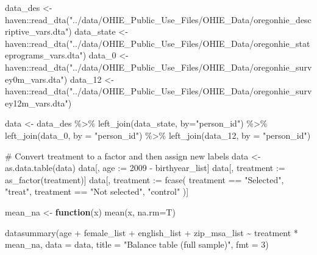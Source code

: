 \documentclass[
  letterpaper,
  DIV=11,
  numbers=noendperiod]{scrartcl}
\newenvironment{Shaded}{\begin{snugshade}}{\end{snugshade}}
\newcommand{\AttributeTok}[1]{\textcolor[rgb]{0.40,0.45,0.13}{#1}}
\newcommand{\CommentTok}[1]{\textcolor[rgb]{0.37,0.37,0.37}{#1}}
\newcommand{\ControlFlowTok}[1]{\textcolor[rgb]{0.00,0.23,0.31}{\textbf{#1}}}
\newcommand{\DecValTok}[1]{\textcolor[rgb]{0.68,0.00,0.00}{#1}}
\newcommand{\ErrorTok}[1]{\textcolor[rgb]{0.68,0.00,0.00}{#1}}
\newcommand{\FunctionTok}[1]{\textcolor[rgb]{0.28,0.35,0.67}{#1}}
\newcommand{\NormalTok}[1]{\textcolor[rgb]{0.00,0.23,0.31}{#1}}
\newcommand{\OtherTok}[1]{\textcolor[rgb]{0.00,0.23,0.31}{#1}}
\newcommand{\SpecialCharTok}[1]{\textcolor[rgb]{0.37,0.37,0.37}{#1}}
\newcommand{\StringTok}[1]{\textcolor[rgb]{0.13,0.47,0.30}{#1}}
\begin{document}
\begin{Shaded}
\begin{Highlighting}[]
\NormalTok{data\_des }\OtherTok{\textless{}{-}}\NormalTok{ haven}\SpecialCharTok{::}\FunctionTok{read\_dta}\NormalTok{(}\StringTok{"../data/OHIE\_Public\_Use\_Files/OHIE\_Data/oregonhie\_descriptive\_vars.dta"}\NormalTok{)}
\NormalTok{data\_state }\OtherTok{\textless{}{-}}\NormalTok{ haven}\SpecialCharTok{::}\FunctionTok{read\_dta}\NormalTok{(}\StringTok{"../data/OHIE\_Public\_Use\_Files/OHIE\_Data/oregonhie\_stateprograms\_vars.dta"}\NormalTok{)}
\NormalTok{data\_0 }\OtherTok{\textless{}{-}}\NormalTok{ haven}\SpecialCharTok{::}\FunctionTok{read\_dta}\NormalTok{(}\StringTok{"../data/OHIE\_Public\_Use\_Files/OHIE\_Data/oregonhie\_survey0m\_vars.dta"}\NormalTok{)}
\NormalTok{data\_12 }\OtherTok{\textless{}{-}}\NormalTok{ haven}\SpecialCharTok{::}\FunctionTok{read\_dta}\NormalTok{(}\StringTok{"../data/OHIE\_Public\_Use\_Files/OHIE\_Data/oregonhie\_survey12m\_vars.dta"}\NormalTok{)}

\NormalTok{data }\OtherTok{\textless{}{-}}\NormalTok{ data\_des }\SpecialCharTok{\%\textgreater{}\%} 
  \FunctionTok{left\_join}\NormalTok{(data\_state, }\AttributeTok{by=}\StringTok{"person\_id"}\NormalTok{) }\SpecialCharTok{\%\textgreater{}\%} 
  \FunctionTok{left\_join}\NormalTok{(data\_0, }\AttributeTok{by =} \StringTok{"person\_id"}\NormalTok{) }\SpecialCharTok{\%\textgreater{}\%} 
  \FunctionTok{left\_join}\NormalTok{(data\_12, }\AttributeTok{by =} \StringTok{"person\_id"}\NormalTok{)}



\CommentTok{\# Convert treatment to a factor and then assign new labels}
\NormalTok{data }\OtherTok{\textless{}{-}} \FunctionTok{as.data.table}\NormalTok{(data)}
\NormalTok{data[, age }\SpecialCharTok{:}\ErrorTok{=} \DecValTok{2009} \SpecialCharTok{{-}}\NormalTok{ birthyear\_list]}
\NormalTok{data[, treatment }\SpecialCharTok{:}\ErrorTok{=} \FunctionTok{as\_factor}\NormalTok{(treatment)]}
\NormalTok{data[, treatment }\SpecialCharTok{:}\ErrorTok{=} \FunctionTok{fcase}\NormalTok{(}
\NormalTok{  treatment }\SpecialCharTok{==} \StringTok{"Selected"}\NormalTok{, }\StringTok{"treat"}\NormalTok{,}
\NormalTok{  treatment }\SpecialCharTok{==} \StringTok{"Not selected"}\NormalTok{, }\StringTok{"control"}
\NormalTok{)]}

\NormalTok{mean\_na }\OtherTok{\textless{}{-}} \ControlFlowTok{function}\NormalTok{(x) }\FunctionTok{mean}\NormalTok{(x, }\AttributeTok{na.rm=}\NormalTok{T)}

\FunctionTok{datasummary}\NormalTok{(age }\SpecialCharTok{+}\NormalTok{ female\_list }\SpecialCharTok{+}\NormalTok{ english\_list }\SpecialCharTok{+}\NormalTok{ zip\_msa\_list }\SpecialCharTok{\textasciitilde{}}\NormalTok{ treatment }\SpecialCharTok{*}\NormalTok{ mean\_na, }
  \AttributeTok{data =}\NormalTok{ data,}
  \AttributeTok{title =} \StringTok{"Balance table (full sample)"}\NormalTok{,}
  \AttributeTok{fmt =} \DecValTok{3}\NormalTok{)}
\end{Highlighting}
\end{Shaded}
\end{document}
